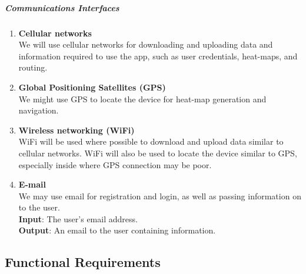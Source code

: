 \documentclass[english]{article}
\begin{document}
						\subparagraph{Communications Interfaces}
    						\begin{enumerate}
    						    \item \textbf{Cellular networks} \\
    						    We will use cellular networks for downloading and uploading data and information required to use the app, such as user credentials, heat-maps, and routing. \\
    						    
    						    \item \textbf{Global Positioning Satellites (GPS)} \\
    						    We might use GPS to locate the device for heat-map generation and navigation.    						    
    						    \item \textbf{Wireless networking (WiFi)} \\
    						    WiFi will be used where possible to download and upload data similar to cellular networks. WiFi will also be used to locate the device similar to GPS, especially inside where GPS connection may be poor.    						    
    						    \item \textbf{E-mail} \\
    						    We may use email for registration and login, as well as passing information on to the user.  \\
    						    \textbf{Input}: The user's email address. \\
    						    \textbf{Output}: An email to the user containing information.    						    
    						    
    						\end{enumerate}
    						
				\subsection{Functional Requirements}
\end{document}
